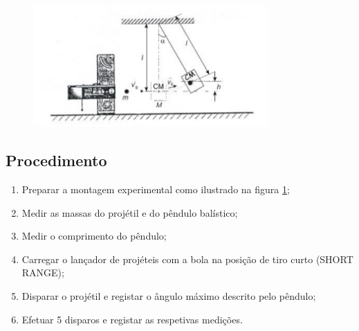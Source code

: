 {\begin{figure}[h]
    \center
    \includegraphics[width=0.8\textwidth]{images/montagem-experimental-parte3}\label{fig:montagem-experimental-parte3}
\end{figure}

\subsection{Procedimento}
\label{subsec:detalhes-experimentais-relevantes-parte3-procedimento}


\begin{enumerate}
    \item Preparar a montagem experimental como ilustrado na figura \ref{fig:montagem-experimental-parte3};
    \item Medir as massas do projétil e do pêndulo balístico;
    \item Medir o comprimento do pêndulo;
    \item Carregar o lançador de projéteis com a bola na posição de tiro curto (SHORT RANGE);
    \item Disparar o projétil e registar o ângulo máximo descrito pelo pêndulo;
    \item Efetuar 5 disparos e registar as respetivas medições.
\end{enumerate}

}
